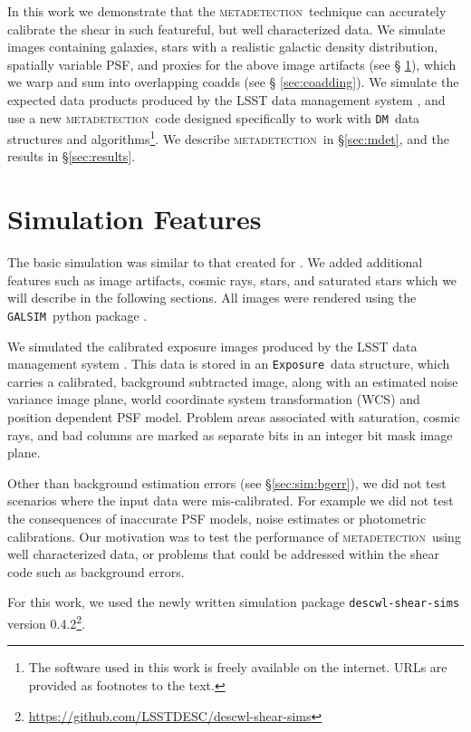 \documentclass[twocolumn,twocolappendix,astrosym]{openjournal}
\newcommand{\galsim}{\texttt{GALSIM}}
\newcommand{\calexp}{\texttt{Exposure}}
\newcommand{\dmshort}{\texttt{DM}}
\newcommand{\dm}{\texttt{LSST DM}}
\newcommand{\mdet}{\textsc{metadetection}}
\begin{document}
In this work we demonstrate that the \mdet\ technique can accurately calibrate
the shear in such featureful, but well characterized data.  We simulate images
containing galaxies, stars with a realistic galactic density distribution,
spatially variable PSF, and proxies for the above image artifacts (see \S
\ref{sec:sim}), which we warp and sum into overlapping coadds (see \S
\ref{sec:coadding}).  We simulate the expected data products produced by the
LSST data management system \citep[\dm,][]{JuricLSST2015,BoschHSC2017}, and use
a new \mdet\ code designed specifically to work with \dmshort\ data structures
and algorithms\footnote{The software used in this work is freely available on
the internet.  URLs are provided as footnotes to the text.}.  We describe
\mdet\ in \S \ref{sec:mdet}, and the results in \S \ref{sec:results}.
 
\section{Simulation Features} \label{sec:sim}

The basic simulation was similar to that created for \citep{mdet20}.  We added
additional features such as image artifacts, cosmic rays, stars, and saturated
stars which we will describe in the following sections.  All images were
rendered using the \galsim\ python package \citep{galsim2015}.

We simulated the calibrated exposure images produced by the LSST data
management system \citep[][\dm, version 0.2021.32]{JuricLSST2015,BoschHSC2017}.
This data is stored in an \calexp\ data structure, which carries a calibrated,
background subtracted image, along with an estimated noise variance image
plane, world coordinate system transformation (WCS) and position dependent PSF
model.  Problem areas associated with saturation, cosmic rays, and bad columns
are marked as separate bits in an integer bit mask image plane.

Other than background estimation errors (see \S \ref{sec:sim:bgerr}), we did not
test scenarios where the input data were mis-calibrated.  For example we did
not test the consequences of inaccurate PSF models, noise estimates or
photometric calibrations.  Our motivation was to test the performance of \mdet\
using well characterized data, or problems that could be addressed within
the shear code such as background errors.

For this work, we used the newly written simulation package
\texttt{descwl-shear-sims} version
0.4.2\footnote{\url{https://github.com/LSSTDESC/descwl-shear-sims}}.
\end{document}

